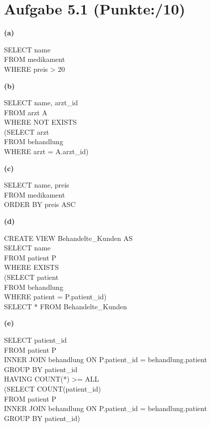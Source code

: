 \documentclass[11pt, a4paper]{article}
\newcommand{\blattnummer}{5}
\newcommand{\p}{10}
\newcommand{\aufgabe}[2] {\section*{Aufgabe \blattnummer.#1 (Punkte:\qquad/#2)}}
\newcommand{\aufgabenteil}[1] {\textbf{(#1)}}
\begin{document}
\aufgabe{1}{\p}
\aufgabenteil{a}
\begin{adjustwidth}{20pt}{20pt}
\begin{tt}
SELECT name \\
FROM medikament \\
WHERE preis > 20 \\
\end{tt}
\end{adjustwidth}
\aufgabenteil{b}
\begin{adjustwidth}{20pt}{20pt}
\begin{tt}
SELECT name, arzt\_id \\
FROM arzt A \\
WHERE NOT EXISTS \\
  (SELECT arzt \\
   FROM behandlung \\
   WHERE arzt = A.arzt\_id) \\
\end{tt}
\end{adjustwidth}
\aufgabenteil{c}
\begin{adjustwidth}{20pt}{20pt}
\begin{tt}
SELECT name, preis \\
FROM medikament \\
ORDER BY preis ASC \\
\end{tt}
\end{adjustwidth}
\aufgabenteil{d}
\begin{adjustwidth}{20pt}{20pt}
\begin{tt}
CREATE VIEW Behandelte\_Kunden AS \\
  SELECT name \\
  FROM patient P \\
  WHERE EXISTS \\
    (SELECT patient \\
     FROM behandlung \\
     WHERE patient = P.patient\_id) \\

\noindent SELECT *
FROM Behandelte\_Kunden
\end{tt}
\end{adjustwidth}
\aufgabenteil{e}
\begin{adjustwidth}{20pt}{20pt}
\begin{tt}
SELECT patient\_id \\
FROM patient P \\
INNER JOIN behandlung ON P.patient\_id = behandlung.patient \\
GROUP BY patient\_id \\
HAVING COUNT(*) >= ALL \\
  (SELECT COUNT(patient\_id) \\
   FROM patient P \\
   INNER JOIN behandlung ON P.patient\_id = behandlung.patient \\
   GROUP BY patient\_id) \\
\end{tt}
\end{adjustwidth}
\end{document}
